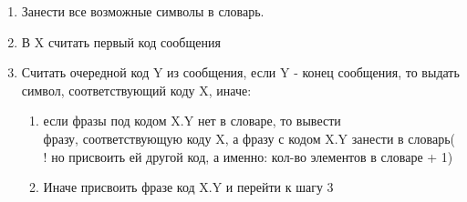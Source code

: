 \documentclass[discrete.tex]{subfiles}
\begin{document}
  \begin{alg} [декодирование]
      \begin{enumerate}
          \item Занести все возможные символы в словарь.
          \item В X считать первый код сообщения
          \item Считать очередной код Y из сообщения, если Y - конец сообщения, то выдать
              символ, соответствующий коду X, иначе:
              \begin{enumerate}
                  \item если фразы под кодом X.Y нет в словаре, то вывести\\ фразу,
                      соответствующую коду X, а фразу с кодом X.Y занести в словарь(
                      ! но присвоить ей другой код, а именно: кол-во элементов в словаре
                      + 1)
                  \item Иначе присвоить фразе код X.Y и перейти к шагу 3
              \end{enumerate}
      \end{enumerate}
  \end{alg}
\end{document}
